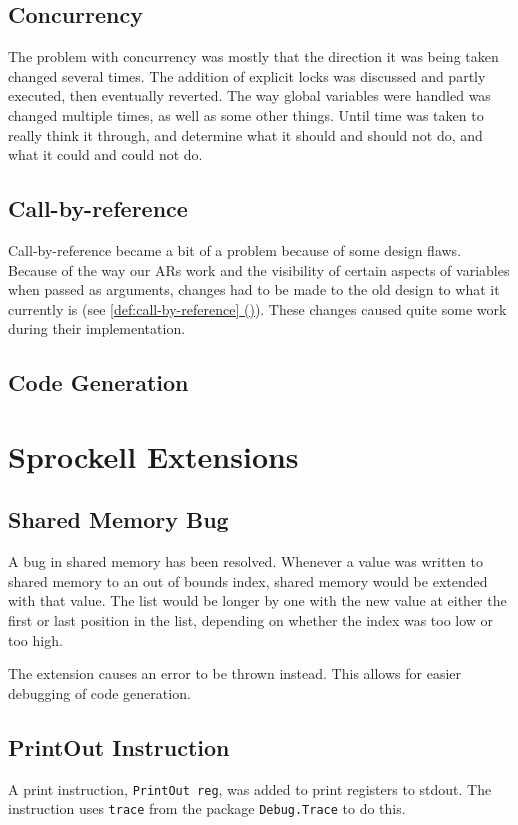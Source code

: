 \documentclass[twoside]{report}
\newcommand*{\fullref}[1]{\hyperref[{#1}]{\ref*{#1} (\nameref*{#1})}}
\begin{document}
\section{Concurrency}
The problem with concurrency was mostly that the direction it was being taken changed several times. The addition of explicit locks was discussed and partly executed, then eventually reverted. The way global variables were handled was changed multiple times, as well as some other things. Until time was taken to really think it through, and determine what it should and should not do, and what it could and could not do. 

\section{Call-by-reference}
Call-by-reference became a bit of a problem because of some design flaws. Because of the way our ARs work and the visibility of certain aspects of variables when passed as arguments, changes had to be made to the old design to what it currently is (see \fullref{def:call-by-reference}). These changes caused quite some work during their implementation.

\section{Code Generation}


\chapter{Sprockell Extensions}
\label{sprockell_extensions}

\section{Shared Memory Bug}
\label{shared_memory_bug}
A bug in shared memory has been resolved. Whenever a value was written to shared memory to an out of bounds index, shared memory would be extended with that value. The list would be longer by one with the new value at either the first or last position in the list, depending on whether the index was too low or too high.

The extension causes an error to be thrown instead. This allows for easier debugging of code generation.

\section{PrintOut Instruction}
\label{printout_instruction}
A print instruction, \texttt{PrintOut reg}, was added to print registers to stdout. The instruction uses \texttt{trace} from the package \texttt{Debug.Trace} to do this.
\end{document}
